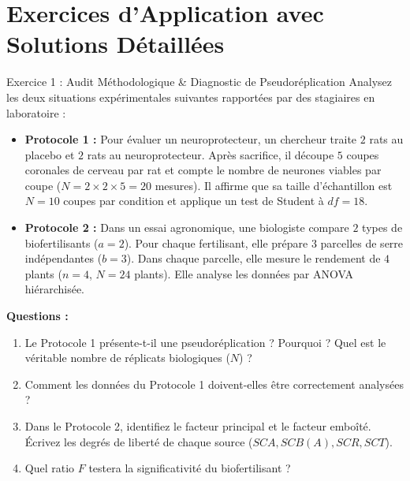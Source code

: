 \documentclass[11pt,a4paper]{article}
\begin{document}
\section{Exercices d'Application avec Solutions Détaillées}

\begin{exercicebox}{Exercice 1 : Audit Méthodologique \& Diagnostic de Pseudoréplication}
Analysez les deux situations expérimentales suivantes rapportées par des stagiaires en laboratoire :
\begin{itemize}
  \item \textbf{Protocole 1 :} Pour évaluer un neuroprotecteur, un chercheur traite $2$ rats au placebo et $2$ rats au neuroprotecteur. Après sacrifice, il découpe $5$ coupes coronales de cerveau par rat et compte le nombre de neurones viables par coupe ($N = 2 \times 2 \times 5 = 20$ mesures). Il affirme que sa taille d'échantillon est $N = 10$ coupes par condition et applique un test de Student à $df = 18$.
  \item \textbf{Protocole 2 :} Dans un essai agronomique, une biologiste compare $2$ types de biofertilisants ($a = 2$). Pour chaque fertilisant, elle prépare $3$ parcelles de serre indépendantes ($b = 3$). Dans chaque parcelle, elle mesure le rendement de $4$ plants ($n = 4$, $N = 24$ plants). Elle analyse les données par ANOVA hiérarchisée.
\end{itemize}
\textbf{Questions :}
\begin{enumerate}[label=\textbf{\alph*.}]
  \item Le Protocole 1 présente-t-il une pseudoréplication ? Pourquoi ? Quel est le véritable nombre de réplicats biologiques ($N$) ?
  \item Comment les données du Protocole 1 doivent-elles être correctement analysées ?
  \item Dans le Protocole 2, identifiez le facteur principal et le facteur emboîté. Écrivez les degrés de liberté de chaque source ($SCA, SCB(A), SCR, SCT$).
  \item Quel ratio $F$ testera la significativité du biofertilisant ?
\end{enumerate}
\end{exercicebox}
\end{document}
